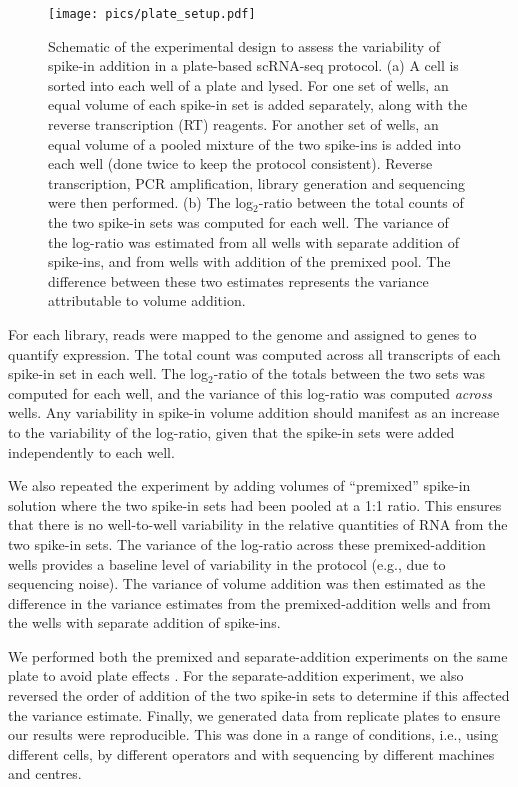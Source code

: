 \documentclass{article}
\begin{document}
\begin{figure}[tbp]
\begin{center}
\texttt{[image: pics/plate\_setup.pdf]}
\end{center}
\caption{Schematic of the experimental design to assess the variability of spike-in addition in a plate-based scRNA-seq protocol.
(a) A cell is sorted into each well of a plate and lysed.
For one set of wells, an equal volume of each spike-in set is added separately, along with the reverse transcription (RT) reagents.
For another set of wells, an equal volume of a pooled mixture of the two spike-ins is added into each well (done twice to keep the protocol consistent).
Reverse transcription, PCR amplification, library generation and sequencing were then performed.
(b) The log$_2$-ratio between the total counts of the two spike-in sets was computed for each well.
The variance of the log-ratio was estimated from all wells with separate addition of spike-ins, and from wells with addition of the premixed pool.
The difference between these two estimates represents the variance attributable to volume addition.
}
\label{fig:expdesign}
\end{figure}

For each library, reads were mapped to the genome and assigned to genes to quantify expression.
The total count was computed across all transcripts of each spike-in set in each well.
The log$_2$-ratio of the totals between the two sets was computed for each well, and the variance of this log-ratio was computed \textit{across} wells.
Any variability in spike-in volume addition should manifest as an increase to the variability of the log-ratio, given that the spike-in sets were added independently to each well.

We also repeated the experiment by adding volumes of ``premixed'' spike-in solution where the two spike-in sets had been pooled at a 1:1 ratio.
This ensures that there is no well-to-well variability in the relative quantities of RNA from the two spike-in sets.
The variance of the log-ratio across these premixed-addition wells provides a baseline level of variability in the protocol (e.g., due to sequencing noise).
The variance of volume addition was then estimated as the difference in the variance estimates from the premixed-addition wells and from the wells with separate addition of spike-ins.

We performed both the premixed and separate-addition experiments on the same plate to avoid plate effects \cite{hicks2015widespread,tung2016}.
For the separate-addition experiment, we also reversed the order of addition of the two spike-in sets to determine if this affected the variance estimate.
Finally, we generated data from replicate plates to ensure our results were reproducible.
This was done in a range of conditions, i.e., using different cells, by different operators and with sequencing by different machines and centres.
\end{document}
